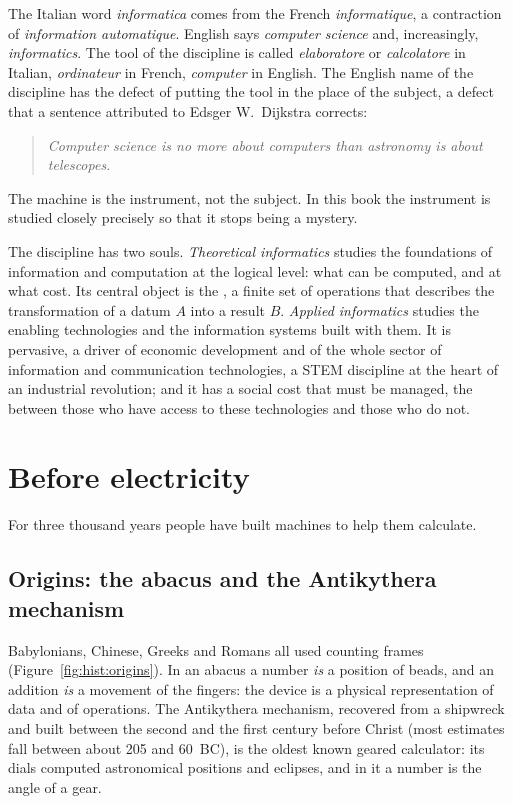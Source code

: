 The Italian word \emph{informatica} comes from the French \emph{informatique},
a contraction of \emph{information automatique}. English says \emph{computer
science} and, increasingly, \emph{informatics}. The tool of the discipline
is called \emph{elaboratore} or \emph{calcolatore} in Italian,
\emph{ordinateur} in French, \emph{computer} in English. The English name of
the discipline has the defect of putting the tool in the place of the subject,
a defect that a sentence attributed to Edsger W.\ Dijkstra corrects:

\begin{quote}\itshape
Computer science is no more about computers than astronomy is about telescopes.
\end{quote}

The machine is the instrument, not the subject. In this book the instrument
is studied closely precisely so that it stops being a mystery.

The discipline has two souls. \emph{Theoretical informatics} studies the
foundations of information and computation at the logical level: what can be
computed, and at what cost. Its central object is the , a
finite set of operations that describes the transformation of a datum $A$ into
a result $B$. \emph{Applied informatics} studies the enabling technologies
and the information systems built with them. It is pervasive, a driver of
economic development and of the whole sector of information and communication
technologies, a STEM discipline at the heart of an industrial revolution; and
it has a social cost that must be managed, the  between
those who have access to these technologies and those who do not.

\section{Before electricity}

For three thousand years people have built machines to help them calculate.

\subsection{Origins: the abacus and the Antikythera mechanism}

Babylonians, Chinese, Greeks and Romans all used counting frames
(Figure~\ref{fig:hist:origins}). In an abacus a number \emph{is} a position
of beads, and an addition \emph{is} a movement of the fingers: the device is a
physical representation of data and of operations. The Antikythera mechanism,
recovered from a shipwreck and built between the second and the first century
before Christ (most estimates fall between about 205 and 60~BC), is the oldest
known geared calculator: its dials computed astronomical positions and
eclipses, and in it a number is the angle of a gear.

